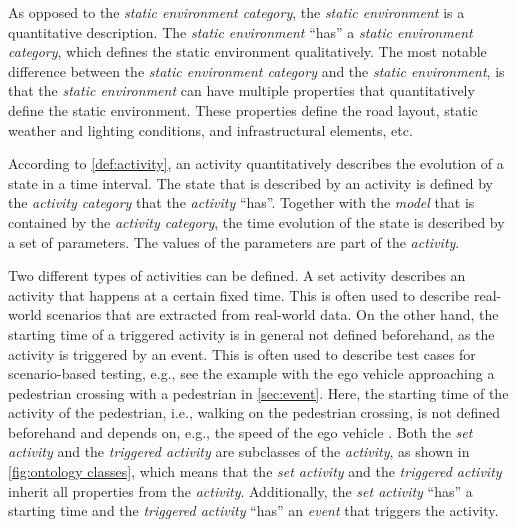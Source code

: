\cbstartc
As opposed to the \textit{static environment category}, the \textit{static environment} is a quantitative description.
\cbend
The \textit{static environment} ``has'' a \textit{static environment category}, which defines the static environment qualitatively. The most notable difference between the \textit{static environment category} and the \textit{static environment}, is that the \textit{static environment} can have multiple properties that quantitatively define the static environment. These properties define the road layout, static weather and lighting conditions, and infrastructural elements, etc.

According to \cref{def:activity}, an activity quantitatively describes the evolution of a state in a time interval. The state that is described by an activity is defined by the \textit{activity category} that the \textit{activity} ``has''. Together with the \textit{model} that is contained by the \textit{activity category}, the time evolution of the state is described by a set of parameters. The values of the parameters are part of the \textit{activity}. 

\cbstart
Two different types of activities can be defined. A set activity describes an activity that happens at a certain fixed time. This is often used to describe real-world scenarios that are extracted from real-world data. On the other hand, the starting time of a triggered activity is in general not defined beforehand, as the activity is triggered by an event. This is often used to describe test cases for scenario-based testing, e.g., see the example with the ego vehicle approaching a pedestrian crossing with a pedestrian in \cref{sec:event}. Here, the starting time of the activity of the pedestrian, i.e., walking on the pedestrian crossing, is not defined beforehand and depends on, e.g., the speed of the ego vehicle \cite{seiniger2015test}. Both the \textit{set activity} and the \textit{triggered activity} are subclasses of the \textit{activity}, as shown in \cref{fig:ontology classes}, which means that the \textit{set activity} and the \textit{triggered activity} inherit all properties from the \textit{activity}. Additionally, the \textit{set activity} ``has'' a starting time and the \textit{triggered activity} ``has'' an \textit{event} that triggers the activity.
\cbend

